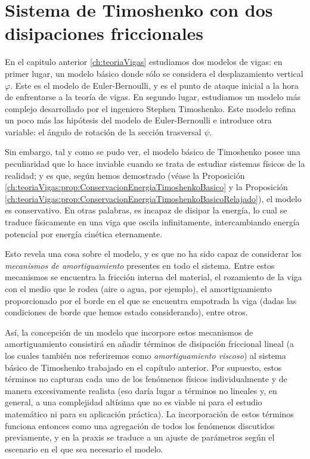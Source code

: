 \chapter{Sistema de Timoshenko con dos disipaciones friccionales}
\label{ch:TimoshenkoFric}

En el capitulo anterior \eqref{ch:teoriaVigas} estudiamos dos modelos de vigas: en primer lugar, un modelo básico donde sólo se considera el desplazamiento vertical $\varphi$. Este es el modelo de Euler-Bernoulli, y es el punto de ataque inicial a la hora de enfrentarse a la teoría de vigas. En segundo lugar, estudiamos un modelo más complejo desarrollado por el ingeniero Stephen Timoshenko. Este modelo refina un poco más las hipótesis del modelo de Euler-Bernoulli e introduce otra variable: el ángulo de rotación de la sección trasversal $\psi$.

Sin embargo, tal y como se pudo ver, el modelo básico de Timoshenko posee una peculiaridad que lo hace inviable cuando se trata de estudiar sistemas físicos de la realidad; y es que, según hemos demostrado (véase la Proposición \ref{ch:teoriaVigas:prop:ConservacionEnergiaTimoshenkoBasico} y la Proposición \ref{ch:teoriaVigas:prop:ConservacionEnergiaTimoshenkoBasicoRelajado}), el modelo es conservativo. En otras palabras, es incapaz de disipar la energía, lo cual se traduce físicamente en una viga que oscila infinitamente, intercambiando energía potencial por energía cinética eternamente. 

Esto revela una cosa sobre el modelo, y es que no ha sido capaz de considerar los \textit{mecanismos de amortiguamiento} presentes en todo el sistema. Entre estos mecanismos se encuentra la fricción interna del material, el rozamiento de la viga con el medio que le rodea (aire o agua, por ejemplo), el amortiguamiento proporcionado por el borde en el que se encuentra empotrada la viga (dadas las condiciones de borde que hemos estado considerando), entre otros.

Así, la concepción de un modelo que incorpore estos mecanismos de amortiguamiento consistirá en añadir términos de disipación friccional lineal (a los cuales también nos referiremos como \textit{amortiguamiento viscoso}) al sistema básico de Timoshenko trabajado en el capítulo anterior. Por supuesto, estos términos no capturan cada uno de los fenómenos físicos individualmente y de manera excesivamente realista (eso daría lugar a términos no lineales y, en general, a una complejidad altísima que no es viable ni para el estudio matemático ni para su aplicación práctica). La incorporación de estos términos funciona entonces como una agregación de todos los fenómenos discutidos previamente, y en la praxis se traduce a un ajuste de parámetros según el escenario en el que sea necesario el modelo. 

